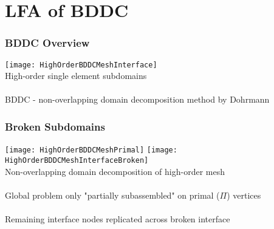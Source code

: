 \documentclass{beamer}
\begin{document}
\section{LFA of BDDC}

\begin{frame}
\begin{center}
\frametitle{BDDC Overview}

\texttt{[image: HighOrderBDDCMeshInterface]}\\
{\small High-order single element subdomains}\\

~\\

BDDC - non-overlapping domain decomposition method by Dohrmann\\

\end{center}
\end{frame}


\begin{frame}
\begin{center}
\frametitle{Broken Subdomains}

\texttt{[image: HighOrderBDDCMeshPrimal]}
\hspace{10mm}
\texttt{[image: HighOrderBDDCMeshInterfaceBroken]}\\
{\small Non-overlapping domain decomposition of high-order mesh}\\

~\\

Global problem only "partially subassembled" on primal ($\Pi$) vertices\\

~\\

Remaining interface nodes replicated across broken interface

\end{center}
\end{frame}

\end{document}
